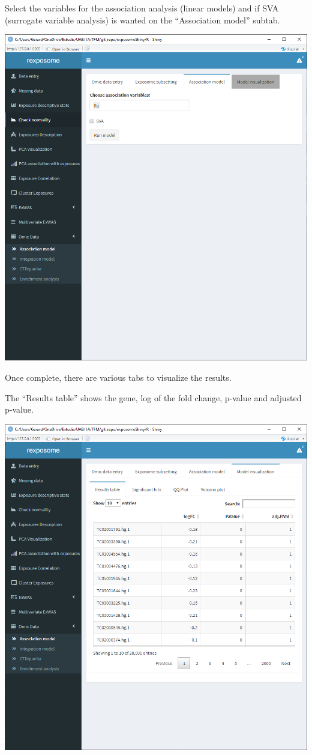 \documentclass[
]{book}
\begin{document}
Select the variables for the association analysis (linear models) and if SVA (surrogate variable analysis) is wanted on the ``Association model'' subtab.

\includegraphics{images/analysis9_4.png}

Once complete, there are various tabs to visualize the results.

The ``Results table'' shows the gene, log of the fold change, p-value and adjusted p-value.

\includegraphics{images/analysis9_5.png}
\end{document}
